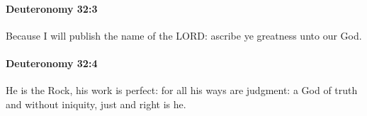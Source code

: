 		\paragraph{Deuteronomy 32:3} %
			\label{DEUTERONOMY-32-3}

			Because I will publish the name of the LORD: ascribe ye greatness unto our God.


		\paragraph{Deuteronomy 32:4} %
			\label{DEUTERONOMY-32-4}

			He is the Rock, his work is perfect: for all his ways are judgment: a God of truth and without iniquity, just and right is he.


